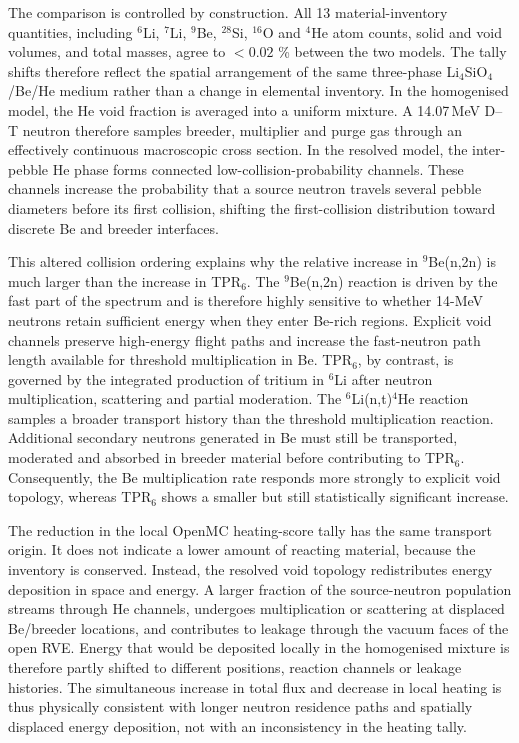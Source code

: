 \documentclass[preprint,12pt]{elsarticle}
\begin{document}
The comparison is controlled by construction.  All 13 material-inventory
quantities, including $^6$Li, $^7$Li, $^9$Be, $^{28}$Si, $^{16}$O and $^4$He
atom counts, solid and void volumes, and total masses, agree to $<0.02$ \%
between the two models.  The tally shifts therefore reflect the spatial
arrangement of the same three-phase Li$_4$SiO$_4$/Be/He medium rather than a
change in elemental inventory.  In the homogenised model, the He void fraction
is averaged into a uniform mixture.  A 14.07\,MeV D--T neutron therefore samples
breeder, multiplier and purge gas through an effectively continuous macroscopic
cross section.  In the resolved model, the inter-pebble He phase forms connected
low-collision-probability channels.  These channels increase the probability
that a source neutron travels several pebble diameters before its first
collision, shifting the first-collision distribution toward discrete Be and
breeder interfaces.

This altered collision ordering explains why the relative increase in
$^9$Be(n,2n) is much larger than the increase in TPR$_6$.  The $^9$Be(n,2n)
reaction is driven by the fast part of the spectrum and is therefore highly
sensitive to whether 14-MeV neutrons retain sufficient energy when they enter
Be-rich regions.  Explicit void channels preserve high-energy flight paths and
increase the fast-neutron path length available for threshold multiplication in
Be.  TPR$_6$, by contrast, is governed by the integrated production of tritium in
$^6$Li after neutron multiplication, scattering and partial moderation.  The
$^6$Li(n,t)$^4$He reaction samples a broader transport history than the
threshold multiplication reaction.  Additional secondary neutrons generated in
Be must still be transported, moderated and absorbed in breeder material before
contributing to TPR$_6$.  Consequently, the Be multiplication rate responds more
strongly to explicit void topology, whereas TPR$_6$ shows a smaller but still
statistically significant increase.

The reduction in the local OpenMC heating-score tally has the same transport origin.
It does not indicate a lower amount of reacting material, because the inventory
is conserved.  Instead, the resolved void topology redistributes energy
deposition in space and energy.  A larger fraction of the
source-neutron population streams through He channels, undergoes multiplication
or scattering at displaced Be/breeder locations, and contributes to leakage
through the vacuum faces of the open RVE.  Energy that would be deposited
locally in the homogenised mixture is therefore partly shifted to different
positions, reaction channels or leakage histories.  The simultaneous increase
in total flux and decrease in local heating is thus physically consistent with
longer neutron residence paths and spatially displaced energy deposition, not
with an inconsistency in the heating tally.
\end{document}
